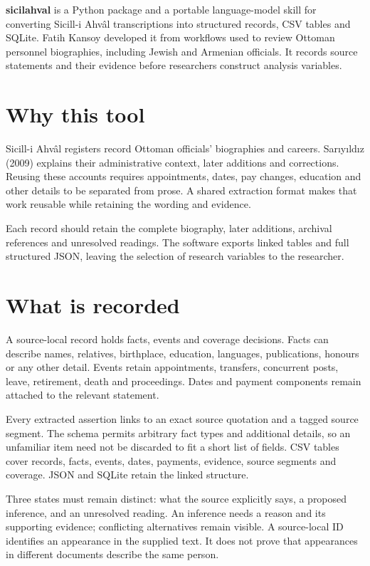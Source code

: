 \documentclass[11pt,a4paper]{article}
\begin{document}

\textbf{sicilahval} is a Python package and a portable language-model skill for converting Sicill-i Ahvâl transcriptions into structured records, CSV tables and SQLite. Fatih Kansoy developed it from workflows used to review Ottoman personnel biographies, including Jewish and Armenian officials. It records source statements and their evidence before researchers construct analysis variables.

\section{Why this tool}
Sicill-i Ahvâl registers record Ottoman officials' biographies and careers. Sarıyıldız (2009) explains their administrative context, later additions and corrections. Reusing these accounts requires appointments, dates, pay changes, education and other details to be separated from prose. A shared extraction format makes that work reusable while retaining the wording and evidence.

Each record should retain the complete biography, later additions, archival references and unresolved readings. The software exports linked tables and full structured JSON, leaving the selection of research variables to the researcher.

\section{What is recorded}
A source-local record holds facts, events and coverage decisions. Facts can describe names, relatives, birthplace, education, languages, publications, honours or any other detail. Events retain appointments, transfers, concurrent posts, leave, retirement, death and proceedings. Dates and payment components remain attached to the relevant statement.

Every extracted assertion links to an exact source quotation and a tagged source segment. The schema permits arbitrary fact types and additional details, so an unfamiliar item need not be discarded to fit a short list of fields. CSV tables cover records, facts, events, dates, payments, evidence, source segments and coverage. JSON and SQLite retain the linked structure.

Three states must remain distinct: what the source explicitly says, a proposed inference, and an unresolved reading. An inference needs a reason and its supporting evidence; conflicting alternatives remain visible. A source-local ID identifies an appearance in the supplied text. It does not prove that appearances in different documents describe the same person.
\end{document}
